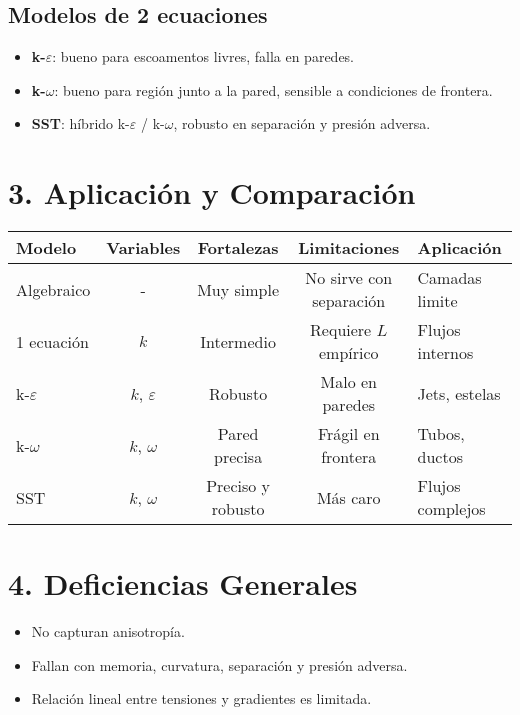 \documentclass[a4paper,12pt]{article}
\begin{document}
	\subsection*{Modelos de 2 ecuaciones}
	\begin{itemize}
		\item \textbf{k-$\varepsilon$}: bueno para escoamentos livres, falla en paredes.
		\item \textbf{k-$\omega$}: bueno para región junto a la pared, sensible a condiciones de frontera.
		\item \textbf{SST}: híbrido k-$\varepsilon$ / k-$\omega$, robusto en separación y presión adversa.
	\end{itemize}
	
	\section*{3. Aplicación y Comparación}
	
	\begin{center}
		\begin{tabular}{|l|c|c|c|l|}
			\hline
			Modelo & Variables & Fortalezas & Limitaciones & Aplicación \\
			\hline
			Algebraico & - & Muy simple & No sirve con separación & Camadas limite \\
			1 ecuación & $k$ & Intermedio & Requiere $L$ empírico & Flujos internos \\
			k-$\varepsilon$ & $k$, $\varepsilon$ & Robusto & Malo en paredes & Jets, estelas \\
			k-$\omega$ & $k$, $\omega$ & Pared precisa & Frágil en frontera & Tubos, ductos \\
			SST & $k$, $\omega$ & Preciso y robusto & Más caro & Flujos complejos \\
			\hline
		\end{tabular}
	\end{center}
	
	\section*{4. Deficiencias Generales}
	\begin{itemize}
		\item No capturan anisotropía.
		\item Fallan con memoria, curvatura, separación y presión adversa.
		\item Relación lineal entre tensiones y gradientes es limitada.
	\end{itemize}
	
\end{document}
